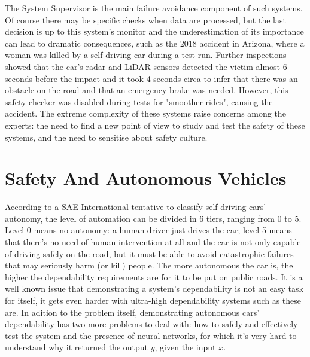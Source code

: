 The System Supervisor is the main failure avoidance component of such systems. Of course there may be specific checks when data are processed, but the last decision is up to this system's monitor and the underestimation of its importance can lead to dramatic consequences, such as the 2018 accident in Arizona, where a woman was killed by a self-driving car during a test run.\cite{arizuber} Further inspections showed that the car's radar and LiDAR sensors detected the victim almost 6 seconds before the impact and it took 4 seconds circa to infer that there was an obstacle on the road and that an emergency brake was needed. However, this safety-checker was disabled during tests for "smoother rides", causing the accident.\cite{govarizuber}\newline\newline
The extreme complexity of these systems raise concerns among the experts: the need to find a new point of view to study and test the safety of these systems, and the need to sensitise about safety culture.\cite{koopman}


\section{Safety And Autonomous Vehicles}

According to a SAE International tentative to classify self-driving cars' autonomy, the level of automation can be divided in 6 tiers, ranging from 0 to 5. Level 0 means no autonomy: a human driver just drives the car; level 5 means that there's no need of human intervention at all and the car is not only capable of driving safely on the road, but it must be able to avoid catastrophic failures that may seriously harm (or kill) people.
The more autonomous the car is, the higher the dependability requirements are for it to be put on public roads.
It is a well known issue that demonstrating a system's dependability is not an easy task for itself, it gets even harder with ultra-high dependability systems such as these are. In adition to the problem itself, demonstrating autonomous cars' dependability has two more problems to deal with: how to safely and effectively test the system and the presence of neural networks, for which it's very hard to understand why it returned the output $y$, given the input $x$.

